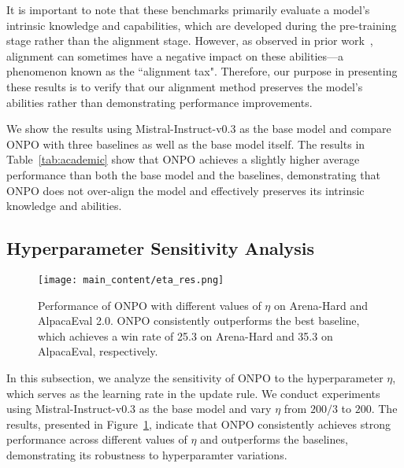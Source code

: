 It is important to note that these benchmarks primarily evaluate a model’s intrinsic knowledge and capabilities, which are developed during the pre-training stage rather than the alignment stage. However, as observed in prior work~\citep{ouyang2022training,openai2023gpt}, alignment can sometimes have a negative impact on these abilities—a phenomenon known as the ``alignment tax". Therefore, our purpose in presenting these results is to verify that our alignment method preserves the model’s abilities rather than demonstrating performance improvements.

We show the results using Mistral-Instruct-v0.3 as the base model and compare ONPO with three baselines as well as the base model itself. The results in Table~\ref{tab:academic} show that ONPO achieves a slightly higher average performance than both the base model and the baselines, demonstrating that ONPO does not over-align the model and effectively preserves its intrinsic knowledge and abilities.

\subsection{Hyperparameter Sensitivity Analysis}
\begin{figure}[t]
\centering
\texttt{[image: main\_content/eta\_res.png]}
\caption{
Performance of ONPO with different values of $\eta$ on Arena-Hard and AlpacaEval 2.0. ONPO consistently outperforms the best baseline, which achieves a win rate of 25.3 on Arena-Hard and 35.3 on AlpacaEval, respectively.}
\label{fig:res_eta}
\end{figure}
In this subsection, we analyze the sensitivity of ONPO to the hyperparameter $\eta$, which serves as the learning rate in the update rule. We conduct experiments using Mistral-Instruct-v0.3 as the base model and vary $\eta$ from $200/3$ to $200$. The results, presented in Figure~\ref{fig:res_eta}, indicate that ONPO consistently achieves strong performance across different values of $\eta$ and outperforms the baselines, demonstrating its robustness to hyperparamter variations.


